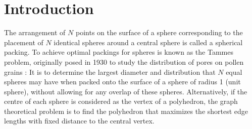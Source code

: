 \section{Introduction}
\label{sec:introductiongregorynewton}

The arrangement of $N$ points on the surface of a sphere corresponding to the
placement of $N$ identical spheres around a central sphere is called a
spherical packing. To achieve optimal packings for spheres is known as the
Tammes problem, originally posed in 1930 to study the distribution of pores on
pollen grains \autocite{Tammes_originnumberarrangement_1930}: It is to
determine the largest diameter and distribution that $N$ equal spheres may have
when packed onto the surface of a sphere of radius 1 (unit sphere), without
allowing for any overlap of these spheres. Alternatively, if the centre of each
sphere is considered as the vertex of a polyhedron, the graph theoretical
problem is to find the polyhedron that maximizes the shortest edge lengths with
fixed distance to the central vertex.

